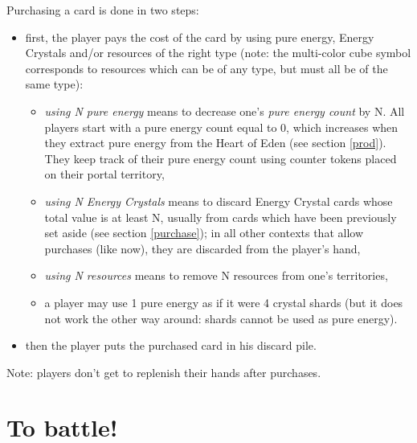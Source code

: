 \documentclass[a4paper]{article}
\begin{document}
\newpage
        Purchasing a card is done in two steps:
        \vspace{-1.3em}
        \begin{itemize}
            \item first, the player pays the cost of the card by using pure energy,
                Energy Crystals and/or resources of the right type
                (note: the multi-color cube symbol corresponds to resources
                which can be of any type, but must all be of the same type):
                \vspace{-0.5em}
                \begin{itemize}
                    \item \textit{using N pure energy} means to decrease one's
                    \textit{pure energy count} by N.
                    All players start with a pure energy count equal to 0,
                    which increases when they extract pure energy from the Heart of Eden
                    (see section \ref{prod}).
                    They keep track of their pure energy count using counter
                    tokens placed on their portal territory,
                    \item \textit{using N Energy Crystals} means to discard Energy Crystal
                        cards whose total value is at least N,
                        usually from cards which have been previously set aside
                        (see section \ref{purchase});
                        in all other contexts that allow purchases (like now),
                        they are discarded from the player's hand,
                    \item \textit{using N resources} means to remove N resources
                        from one's territories,
                    \item a player may use 1 pure energy as if it were 4 crystal shards
                    (but it does not work the other way around: shards cannot be used
                    as pure energy).
                \end{itemize}
            \item then the player puts the purchased card in his discard pile.
        \end{itemize}
        
        Note: players don't get to replenish their hands after purchases.


\section{To battle!}
\end{document}
